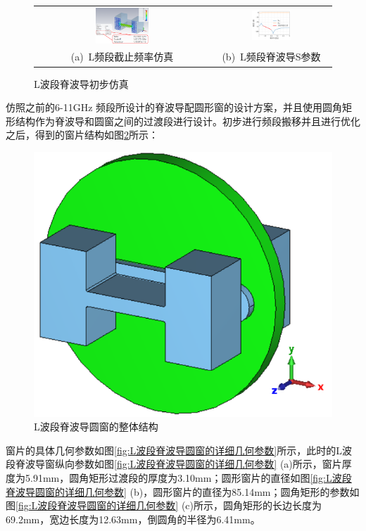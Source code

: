 \documentclass[master]{thesis-uestc}
\begin{document}
\begin{figure}[!htb]
    \small
    \centering
    \begin{tabular}{@{\ }c@{\ }c}
        \includegraphics[width=0.32\textwidth]{pic/chapter4/脊波导截止频率仿真.png} & 
        \hspace{5pt}
        \includegraphics[width=0.35\textwidth]{pic/chapter4/L波段脊波导S参数.png}     \\
        \mbox{\small (a) L频段截止频率仿真}                                                                               & 
        \mbox{\small (b) L频段脊波导S参数}                                                                                  \\
    \end{tabular}
    \caption{L波段脊波导初步仿真}
    \label{fig:L波段脊波导初步仿真}
\end{figure}


仿照之前的6-11GHz 频段所设计的脊波导配圆形窗的设计方案，并且使用圆角矩形结构作为脊波导和圆窗之间的过渡段进行设计。初步进行频段搬移并且进行优化之后，得到的窗片结构如图\ref{fig:L波段脊波导圆窗的整体结构}所示：
\begin{figure}[!htb]
    \centering
    \includegraphics[width=0.25\linewidth]{pic/chapter4/L波段脊波导圆窗的整体结构.png}
    \caption{L波段脊波导圆窗的整体结构}
    \label{fig:L波段脊波导圆窗的整体结构}
\end{figure}

窗片的具体几何参数如图\ref{fig:L波段脊波导圆窗的详细几何参数}所示，此时的L波段脊波导窗纵向参数如图\ref{fig:L波段脊波导圆窗的详细几何参数} (a)所示，窗片厚度为5.91mm，圆角矩形过渡段的厚度为3.10mm；圆形窗片的直径如图\ref{fig:L波段脊波导圆窗的详细几何参数} (b)，圆形窗片的直径为85.14mm；圆角矩形的参数如图\ref{fig:L波段脊波导圆窗的详细几何参数} (c)所示，圆角矩形的长边长度为69.2mm，宽边长度为12.63mm，倒圆角的半径为6.41mm。
\end{document}
